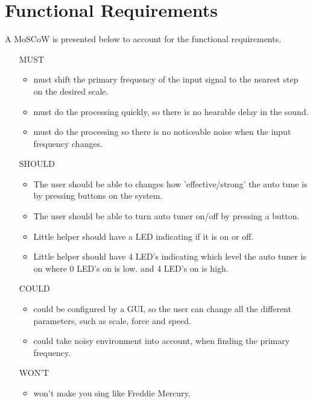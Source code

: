 \section{Functional Requirements}
A MoSCoW is presented below to account for the functional requirements.

\begin{itemize}
	\item[MUST] ~
	\begin{itemize}
		\item \systemName must shift the primary frequency of the input signal to the nearest step on the desired scale.
		\item \systemName must do the processing quickly, so there is no hearable delay in the sound.
		\item \systemName must do the processing so there is no noticeable noise when the input frequency changes.
	\end{itemize}
	\item[SHOULD] ~
	\begin{itemize}
		\item The user should be able to changes how 'effective/strong' the auto tune is by pressing buttons on the system.
		\item The user should be able to turn auto tuner on/off by pressing a button.
		\item Little helper should have a LED indicating if it is on or off.
		\item Little helper should have 4 LED's indicating which level the auto tuner is on where 0 LED's on is low. and 4 LED's on is high.
	\end{itemize}
	\item[COULD] ~
	\begin{itemize}
		\item \systemName could be configured by a GUI, so the user can change all the different parameters, such as scale, force and speed.
		\item \systemName could take noisy environment into account, when finding the primary frequency.
	\end{itemize}
	\item[WON'T] ~
	\begin{itemize}
		\item \systemName won't make you sing like Freddie Mercury.
	\end{itemize}
\end{itemize}

